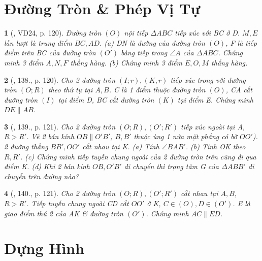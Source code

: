 \documentclass{article}
\newtheorem{baitoan}{}
\begin{document}

\section{Đường Tròn \& Phép Vị Tự}

\begin{baitoan}[\cite{Binh_Toan_9_tap_1}, VD24, p. 120]
	Đường tròn $(O)$ nội tiếp $\Delta ABC$ tiếp xúc với BC ở D. $M,E$ lần lượt là trung điểm $BC,AD$. (a) DN là đường của đường tròn $(O)$, F là tiếp điểm trên BC của đường tròn $(O')$ bàng tiếp trong $\angle{A}$ của $\Delta ABC$. Chứng minh 3 điểm $A,N,F$ thẳng hàng. (b) Chứng minh 3 điểm $E,O,M$ thẳng hàng.
\end{baitoan}

\begin{baitoan}[\cite{Binh_Toan_9_tap_1}, 138., p. 120]
	Cho 2 đường tròn $(I;r),(K,r)$ tiếp xúc trong với đường tròn $(O;R)$ theo thứ tự tại $A,B$. C là 1 điểm thuộc đường tròn $(O)$, CA cắt đường tròn $(I)$ tại điểm D, BC cắt đường tròn $(K)$ tại điểm E. Chứng minh $DE\parallel AB$.
\end{baitoan}

\begin{baitoan}[\cite{Binh_Toan_9_tap_1}, 139., p. 121]
	Cho 2 đường tròn $(O;R),(O';R')$ tiếp xúc ngoài tại A, $R > R'$. Vẽ 2 bán kính $OB\parallel O'B'$, $B,B'$ thuộc ùng 1 nửa mặt phẳng có bờ $OO'$). 2 đường thẳng $BB',OO'$ cắt nhau tại K. (a) Tính $\angle{BAB'}$. (b) Tính OK theo $R,R'$. (c) Chứng minh tiếp tuyến chung ngoài của 2 đường tròn trên cũng đi qua điểm K. (d) Khi 2 bán kính $OB,O'B'$ di chuyển thì trọng tâm G của $\Delta ABB'$ di chuyển trên đường nào?
\end{baitoan}

\begin{baitoan}[\cite{Binh_Toan_9_tap_1}, 140., p. 121]
	Cho 2 đường tròn $(O;R),(O';R')$ cắt nhau tại $A,B$, $R > R'$. Tiếp tuyến chung ngoài CD cắt $OO'$ ở K, $C\in(O),D\in(O')$. E là giao điểm thứ 2 của AK \& đường tròn $(O')$. Chứng minh $AC\parallel ED$.
\end{baitoan}


\section{Dựng Hình}
\end{document}
